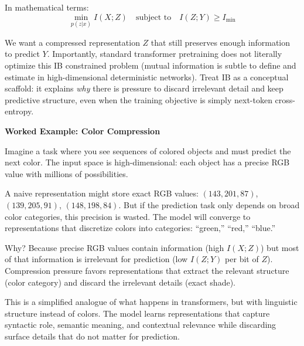 In mathematical terms:
\begin{equation}
\min_{p(z|x)} I(X; Z) \quad \text{subject to} \quad I(Z; Y) \geq I_{\min}
\end{equation}

We want a compressed representation $Z$ that still preserves enough information to predict $Y$. Importantly, standard transformer pretraining does not literally optimize this IB constrained problem (mutual information is subtle to define and estimate in high-dimensional deterministic networks). Treat IB as a conceptual scaffold: it explains \emph{why} there is pressure to discard irrelevant detail and keep predictive structure, even when the training objective is simply next-token cross-entropy.

\vspace{1.5em}

\begin{examplebox}
\textbf{Worked Example: Color Compression}

Imagine a task where you see sequences of colored objects and must predict the next color. The input space is high-dimensional: each object has a precise RGB value with millions of possibilities.

\vspace{0.5em}

A naive representation might store exact RGB values: $(143, 201, 87)$, $(139, 205, 91)$, $(148, 198, 84)$. But if the prediction task only depends on broad color categories, this precision is wasted. The model will converge to representations that discretize colors into categories: ``green,'' ``red,'' ``blue.''

\vspace{0.5em}

Why? Because precise RGB values contain information (high $I(X; Z)$) but most of that information is irrelevant for prediction (low $I(Z; Y)$ per bit of $Z$). Compression pressure favors representations that extract the relevant structure (color category) and discard the irrelevant details (exact shade).

\vspace{0.5em}

This is a simplified analogue of what happens in transformers, but with linguistic structure instead of colors. The model learns representations that capture syntactic role, semantic meaning, and contextual relevance while discarding surface details that do not matter for prediction.
\end{examplebox}

